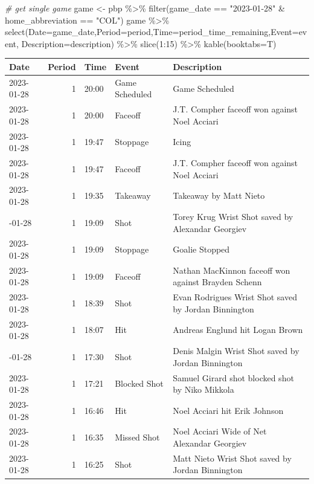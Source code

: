 \documentclass[
  11pt,
]{book}
\newenvironment{Shaded}{\begin{snugshade}}{\end{snugshade}}
\newcommand{\AttributeTok}[1]{\textcolor[rgb]{0.77,0.63,0.00}{#1}}
\newcommand{\CommentTok}[1]{\textcolor[rgb]{0.56,0.35,0.01}{\textit{#1}}}
\newcommand{\DecValTok}[1]{\textcolor[rgb]{0.00,0.00,0.81}{#1}}
\newcommand{\FunctionTok}[1]{\textcolor[rgb]{0.00,0.00,0.00}{#1}}
\newcommand{\NormalTok}[1]{#1}
\newcommand{\OtherTok}[1]{\textcolor[rgb]{0.56,0.35,0.01}{#1}}
\newcommand{\SpecialCharTok}[1]{\textcolor[rgb]{0.00,0.00,0.00}{#1}}
\newcommand{\StringTok}[1]{\textcolor[rgb]{0.31,0.60,0.02}{#1}}
\theoremstyle{definition}
\theoremstyle{definition}
\theoremstyle{definition}
\theoremstyle{definition}
\theoremstyle{remark}
\begin{document}
\begin{Shaded}
\begin{Highlighting}[]
\CommentTok{\# get single game}
\NormalTok{game }\OtherTok{\textless{}{-}}\NormalTok{ pbp }\SpecialCharTok{\%\textgreater{}\%}
  \FunctionTok{filter}\NormalTok{(game\_date }\SpecialCharTok{==} \StringTok{"2023{-}01{-}28"} \SpecialCharTok{\&}\NormalTok{ home\_abbreviation }\SpecialCharTok{==} \StringTok{"COL"}\NormalTok{)}
\NormalTok{game }\SpecialCharTok{\%\textgreater{}\%} 
  \FunctionTok{select}\NormalTok{(}\AttributeTok{Date=}\NormalTok{game\_date,}\AttributeTok{Period=}\NormalTok{period,}\AttributeTok{Time=}\NormalTok{period\_time\_remaining,}\AttributeTok{Event=}\NormalTok{event,}
         \AttributeTok{Description=}\NormalTok{description) }\SpecialCharTok{\%\textgreater{}\%}
  \FunctionTok{slice}\NormalTok{(}\DecValTok{1}\SpecialCharTok{:}\DecValTok{15}\NormalTok{)  }\SpecialCharTok{\%\textgreater{}\%}
  \FunctionTok{kable}\NormalTok{(}\AttributeTok{booktabs=}\NormalTok{T)}
\end{Highlighting}
\end{Shaded}

\begin{tabular}{lrlll}
\toprule
Date & Period & Time & Event & Description\\
\midrule
2023-01-28 & 1 & 20:00 & Game Scheduled & Game Scheduled\\
2023-01-28 & 1 & 20:00 & Faceoff & J.T. Compher faceoff won against Noel Acciari\\
2023-01-28 & 1 & 19:47 & Stoppage & Icing\\
2023-01-28 & 1 & 19:47 & Faceoff & J.T. Compher faceoff won against Noel Acciari\\
2023-01-28 & 1 & 19:35 & Takeaway & Takeaway by Matt Nieto\\
\addlinespace
2023-01-28 & 1 & 19:09 & Shot & Torey Krug Wrist Shot saved by Alexandar Georgiev\\
2023-01-28 & 1 & 19:09 & Stoppage & Goalie Stopped\\
2023-01-28 & 1 & 19:09 & Faceoff & Nathan MacKinnon faceoff won against Brayden Schenn\\
2023-01-28 & 1 & 18:39 & Shot & Evan Rodrigues Wrist Shot saved by Jordan Binnington\\
2023-01-28 & 1 & 18:07 & Hit & Andreas Englund hit Logan Brown\\
\addlinespace
2023-01-28 & 1 & 17:30 & Shot & Denis Malgin Wrist Shot saved by Jordan Binnington\\
2023-01-28 & 1 & 17:21 & Blocked Shot & Samuel Girard shot blocked shot by Niko Mikkola\\
2023-01-28 & 1 & 16:46 & Hit & Noel Acciari hit Erik Johnson\\
2023-01-28 & 1 & 16:35 & Missed Shot & Noel Acciari Wide of Net Alexandar Georgiev\\
2023-01-28 & 1 & 16:25 & Shot & Matt Nieto Wrist Shot saved by Jordan Binnington\\
\bottomrule
\end{tabular}
\end{document}
